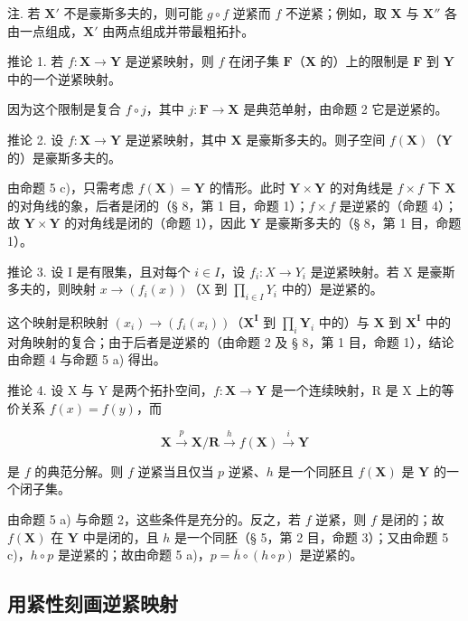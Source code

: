注. 若 \(\mathbf{X}'\) 不是豪斯多夫的，则可能 \(g \circ f\) 逆紧而 \(f\) 不逆紧；例如，取 \(\mathbf{X}\) 与 \(\mathbf{X}''\) 各由一点组成，\(\mathbf{X}'\) 由两点组成并带最粗拓扑。

推论 1. 若 \(f: \mathbf{X} \to \mathbf{Y}\) 是逆紧映射，则 \(f\) 在闭子集 \(\mathbf{F}\)（\(\mathbf{X}\) 的）上的限制是 \(\mathbf{F}\) 到 \(\mathbf{Y}\) 中的一个逆紧映射。

因为这个限制是复合 \(f \circ j\)，其中 \(j: \mathbf{F} \to \mathbf{X}\) 是典范单射，由命题 2 它是逆紧的。

推论 2. 设 \(f: \mathbf{X} \to \mathbf{Y}\) 是逆紧映射，其中 \(\mathbf{X}\) 是豪斯多夫的。则子空间 \(f(\mathbf{X})\)（\(\mathbf{Y}\) 的）是豪斯多夫的。

由命题 5 c)，只需考虑 \(f(\mathbf{X}) = \mathbf{Y}\) 的情形。此时 \(\mathbf{Y} \times \mathbf{Y}\) 的对角线是 \(f \times f\) 下 \(\mathbf{X}\) 的对角线的象，后者是闭的（§ 8，第 1 目，命题 1）；\(f \times f\) 是逆紧的（命题 4）；故 \(\mathbf{Y} \times \mathbf{Y}\) 的对角线是闭的（命题 1），因此 \(\mathbf{Y}\) 是豪斯多夫的（§ 8，第 1 目，命题 1）。

推论 3. 设 I 是有限集，且对每个 \(i \in I\)，设 \(f_i: X \to Y_i\) 是逆紧映射。若 X 是豪斯多夫的，则映射 \(x \to (f_i(x))\)（X 到 \(\prod_{i \in I} Y_i\) 中的）是逆紧的。

这个映射是积映射 \((x_{i})\to (f_{i}(x_{i}))\)（\(\mathbf{X}^{\mathbf{I}}\) 到 \(\prod_{i}\mathbf{Y}_{i}\) 中的）与 \(\mathbf{X}\) 到 \(\mathbf{X}^{\mathbf{I}}\) 中的对角映射的复合；由于后者是逆紧的（由命题 2 及 § 8，第 1 目，命题 1），结论由命题 4 与命题 5 a) 得出。

推论 4. 设 X 与 Y 是两个拓扑空间，\(f: \mathbf{X} \to \mathbf{Y}\) 是一个连续映射，R 是 X 上的等价关系 \(f(x) = f(y)\)，而

\[
\mathbf {X} \xrightarrow {p} \mathbf {X} / \mathbf {R} \xrightarrow {h} f (\mathbf {X}) \xrightarrow {i} \mathbf {Y}
\]

是 \(f\) 的典范分解。则 \(f\) 逆紧当且仅当 \(p\) 逆紧、\(h\) 是一个同胚且 \(f(\mathbf{X})\) 是 \(\mathbf{Y}\) 的一个闭子集。

由命题 5 a) 与命题 2，这些条件是充分的。反之，若 \(f\) 逆紧，则 \(f\) 是闭的；故 \(f(\mathbf{X})\) 在 \(\mathbf{Y}\) 中是闭的，且 \(h\) 是一个同胚（§ 5，第 2 目，命题 3）；又由命题 5 c)，\(h \circ p\) 是逆紧的；故由命题 5 a)，\(p = \overline{h} \circ (h \circ p)\) 是逆紧的。

\subsection{用紧性刻画逆紧映射}

